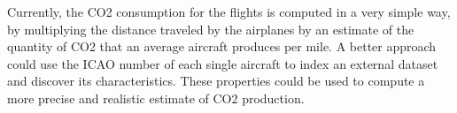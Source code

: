 \documentclass{vldb}
\begin{document}
Currently, the CO2 consumption for the flights is computed in a very simple way,
by multiplying the distance traveled by the airplanes by an estimate of the
quantity of CO2 that an average aircraft produces per mile. A better approach
could use the ICAO number of each single aircraft to index an external dataset
and discover its characteristics. These properties could be used to compute a
more precise and realistic estimate of CO2 production.



\printbibliography
\end{document}
